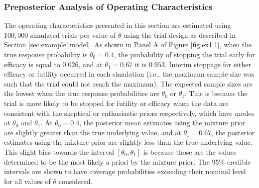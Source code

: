\documentclass[useAMS,usenatbib,referee]{biom}
\begin{document}
\subsubsection{Preposterior Analysis of Operating Characteristics}\label{sec:ex1.1}
The operating characteristics presented in this section are estimated using $100,000$ simulated trials per value of $\theta$ using the trial design as described in Section \ref{sec:example1model}. 
%
As shown in Panel A of Figure \ref{fig:ex1.1}, when the true response probability is $\theta_0=0.4$, the probability of stopping the trial early for efficacy is equal to $0.026$, and at $\theta_1=0.67$ it is $0.953$. 
%
Interim stoppage for either efficacy or futility occurred in each simulation (i.e., the maximum sample size was such that the trial could not reach the maximum). The expected sample sizes are the lowest when the true response probabilities are $\theta_0$ or $\theta_1$. This is because the trial is more likely to be stopped for futility or efficacy when the data are consistent with the skeptical or enthusiastic priors respectively, which have modes at $\theta_0$ and $\theta_1$. 
%
At $\theta_0=0.4$, the posterior mean estimates using the mixture prior are slightly greater than the true underlying value, and at $\theta_1=0.67$, the posterior estimates using the mixture prior are slightly less than the true underlying value. 
%
This slight bias towards the interval $[\theta_0,\theta_1]$ is because those are the values determined to be the most likely a priori by the mixture prior.
%
%
The 95\% credible intervals are shown to have coverage probabilities exceeding their nominal level for all values of $\theta$ considered.
%
\end{document}

